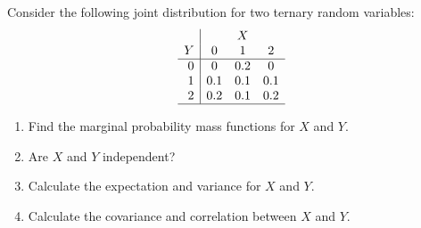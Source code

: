 \item * Consider the following joint distribution for two ternary random variables:
\[  \begin{array}{r|ccc}
& \multicolumn{3}{c}{X} \\
Y & 0 & 1 & 2 \\
\hline
0 & 0 & 0.2 & 0 \\
1 & 0.1 & 0.1 & 0.1 \\
2 & 0.2 & 0.1 & 0.2 \\
\hline
\end{array} \]
\begin{enumerate}
\item Find the marginal probability mass functions for $X$ and $Y$.
\item Are $X$ and $Y$ independent?
\item Calculate the expectation and variance for $X$ and $Y$.
\item Calculate the covariance and correlation between $X$ and $Y$.
\end{enumerate}


